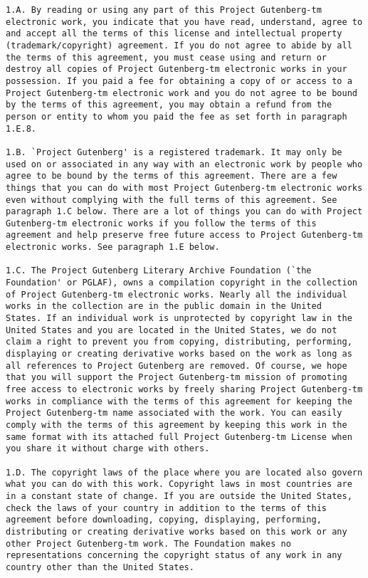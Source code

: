 \documentclass[oneside]{book}
\begin{document}
\begin{verbatim}
1.A. By reading or using any part of this Project Gutenberg-tm
electronic work, you indicate that you have read, understand, agree to
and accept all the terms of this license and intellectual property
(trademark/copyright) agreement. If you do not agree to abide by all
the terms of this agreement, you must cease using and return or
destroy all copies of Project Gutenberg-tm electronic works in your
possession. If you paid a fee for obtaining a copy of or access to a
Project Gutenberg-tm electronic work and you do not agree to be bound
by the terms of this agreement, you may obtain a refund from the
person or entity to whom you paid the fee as set forth in paragraph
1.E.8.

1.B. `Project Gutenberg' is a registered trademark. It may only be
used on or associated in any way with an electronic work by people who
agree to be bound by the terms of this agreement. There are a few
things that you can do with most Project Gutenberg-tm electronic works
even without complying with the full terms of this agreement. See
paragraph 1.C below. There are a lot of things you can do with Project
Gutenberg-tm electronic works if you follow the terms of this
agreement and help preserve free future access to Project Gutenberg-tm
electronic works. See paragraph 1.E below.

1.C. The Project Gutenberg Literary Archive Foundation (`the
Foundation' or PGLAF), owns a compilation copyright in the collection
of Project Gutenberg-tm electronic works. Nearly all the individual
works in the collection are in the public domain in the United
States. If an individual work is unprotected by copyright law in the
United States and you are located in the United States, we do not
claim a right to prevent you from copying, distributing, performing,
displaying or creating derivative works based on the work as long as
all references to Project Gutenberg are removed. Of course, we hope
that you will support the Project Gutenberg-tm mission of promoting
free access to electronic works by freely sharing Project Gutenberg-tm
works in compliance with the terms of this agreement for keeping the
Project Gutenberg-tm name associated with the work. You can easily
comply with the terms of this agreement by keeping this work in the
same format with its attached full Project Gutenberg-tm License when
you share it without charge with others.

1.D. The copyright laws of the place where you are located also govern
what you can do with this work. Copyright laws in most countries are
in a constant state of change. If you are outside the United States,
check the laws of your country in addition to the terms of this
agreement before downloading, copying, displaying, performing,
distributing or creating derivative works based on this work or any
other Project Gutenberg-tm work. The Foundation makes no
representations concerning the copyright status of any work in any
country other than the United States.


\end{verbatim}
\end{document}
